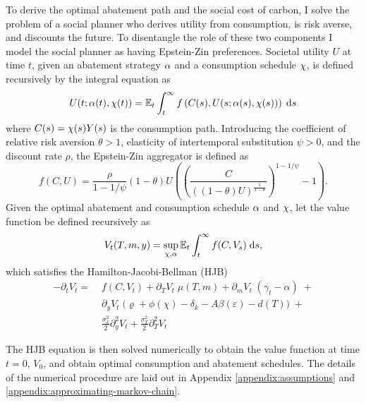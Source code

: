\documentclass[../../main.tex]{subfiles}
\begin{document}
To derive the optimal abatement path and the social cost of carbon, I solve the problem of a social planner who derives utility from consumption, is risk averse, and discounts the future. To disentangle the role of these two components I model the social planner as having Epstein-Zin preferences. Societal utility $U$ at time $t$, given an abatement strategy $\alpha$ and a consumption schedule $\chi$, is defined recursively by the integral equation as \begin{equation} \label{eq:utility}
    U(t; \alpha(t), \chi(t)) = \operatorname{\mathbb{E}}_t \int^{\infty}_t f\left(C(s), U(s; \alpha(s), \chi(s))\right) \; \mathrm{d}s
\end{equation} where $C(s) = \chi(s) Y(s)$ is the consumption path. Introducing the coefficient of relative risk aversion $\theta > 1$, elasticity of intertemporal substitution $\psi > 0$, and the discount rate $\rho$, the Epstein-Zin aggregator \citep{duffie_asset_1992} is defined as \begin{equation} \label{eq:aggregator}
    f(C, U) = \frac{\rho}{1 - 1 / \psi} (1 - \theta) U  \left( \left(\frac{C}{((1 - \theta) U)^{\frac{1}{1 - \theta}}}\right)^{1 - 1 / \psi} - 1 \right).
\end{equation} Given the optimal abatement and consumption schedule $\alpha$ and $\chi$, let the value function be defined recursively as \begin{equation}
    V_t(T, m, y) = \sup_{\chi, \alpha} \operatorname{\mathbb{E}}_t \int^{\infty}_t f(C, V_s) \; \mathrm{d}s,
\end{equation} which satisfies the  Hamilton-Jacobi-Bellman (HJB) \begin{equation}
    \begin{split}
        -\partial_t V_t = \; &f(C, V_t) + \partial_T V_t \; \mu(T, m) + \partial_m V_t \; (\gamma_t - \alpha) \; + \\
        &\partial_y V_t \; \Big(\varrho + \phi(\chi) - \delta_k - A \beta(\varepsilon) - d(T) \Big) \; + \\
        &\frac{\sigma^2_k}{2} \partial^2_y V_t + \frac{\sigma^2_T}{2} \partial^2_T V_t
    \end{split}
\end{equation}

The HJB equation is then solved numerically to obtain the value function at time $t = 0$, $V_0$, and obtain optimal consumption and abatement schedules. The details of the numerical procedure are laid out in Appendix \ref{appendix:assumptions} and \ref{appendix:approximating-markov-chain}.
\end{document}
